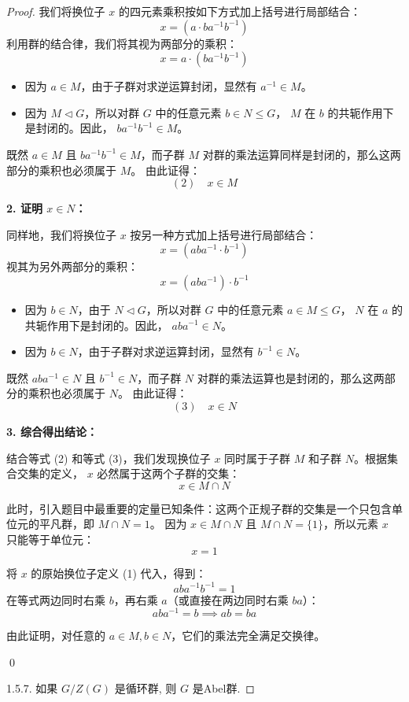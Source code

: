 \documentclass[]{article}
\begin{document}
\begin{proof}
我们将换位子 $x$ 的四元素乘积按如下方式加上括号进行局部结合：
\[ x = (a \cdot b a^{-1} b^{-1}) \]
利用群的结合律，我们将其视为两部分的乘积：
\[ x = a \cdot (b a^{-1} b^{-1}) \]

\begin{itemize}
	\item 因为 $a \in M$，由于子群对求逆运算封闭，显然有 $a^{-1} \in M$。
	\item 因为 $M \triangleleft G$，所以对群 $G$ 中的任意元素 $b \in N \leqslant G$， $M$ 在 $b$ 的共轭作用下是封闭的。因此， $b a^{-1} b^{-1} \in M$。
\end{itemize}
既然 $a \in M$ 且 $b a^{-1} b^{-1} \in M$，而子群 $M$ 对群的乘法运算同样是封闭的，那么这两部分的乘积也必须属于 $M$。
由此证得：
\[ (2) \quad x \in M \]

\bigskip
\noindent \textbf{2. 证明 $x \in N$：}

同样地，我们将换位子 $x$ 按另一种方式加上括号进行局部结合：
\[ x = (a b a^{-1} \cdot b^{-1}) \]
视其为另外两部分的乘积：
\[ x = (a b a^{-1}) \cdot b^{-1} \]

\begin{itemize}
	\item 因为 $b \in N$，由于 $N \triangleleft G$，所以对群 $G$ 中的任意元素 $a \in M \leqslant G$， $N$ 在 $a$ 的共轭作用下是封闭的。因此， $a b a^{-1} \in N$。
	\item 因为 $b \in N$，由于子群对求逆运算封闭，显然有 $b^{-1} \in N$。
\end{itemize}
既然 $a b a^{-1} \in N$ 且 $b^{-1} \in N$，而子群 $N$ 对群的乘法运算也是封闭的，那么这两部分的乘积也必须属于 $N$。
由此证得：
\[ (3) \quad x \in N \]

\bigskip
\noindent \textbf{3. 综合得出结论：}

结合等式 (2) 和等式 (3)，我们发现换位子 $x$ 同时属于子群 $M$ 和子群 $N$。根据集合交集的定义， $x$ 必然属于这两个子群的交集：
\[ x \in M \cap N \]

此时，引入题目中最重要的定量已知条件：这两个正规子群的交集是一个只包含单位元的平凡群，即 $M \cap N = 1$。
因为 $x \in M \cap N$ 且 $M \cap N = \{1\}$，所以元素 $x$ 只能等于单位元：
\[ x = 1 \]

将 $x$ 的原始换位子定义 (1) 代入，得到：
\[ a b a^{-1} b^{-1} = 1 \]
在等式两边同时右乘 $b$，再右乘 $a$（或直接在两边同时右乘 $ba$）：
\[ a b a^{-1} = b \implies ab = ba \]

由此证明，对任意的 $a \in M, b \in N$，它们的乘法完全满足交换律。

\qed

1.5.7. 如果 $G / Z(G)$ 是循环群, 则 $G$ 是Abel群. 


\end{proof}
\end{document}
